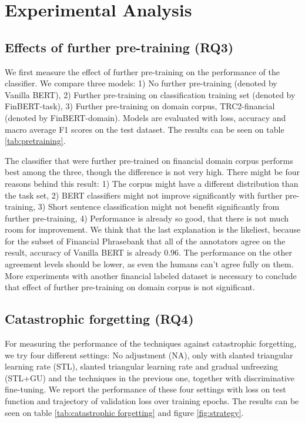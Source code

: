 \documentclass[../main.tex]{subfiles}
\begin{document}
\section{Experimental Analysis} \label{exp_analysis}

\subsection{Effects of further pre-training (RQ3)}
We first measure the effect of further pre-training on the performance of the classifier. We  compare three models: 1) No further pre-training (denoted by Vanilla BERT), 2) Further pre-training on classification training set (denoted by FinBERT-task), 3) Further pre-training on domain corpus, TRC2-financial (denoted by FinBERT-domain). Models are evaluated with loss, accuracy and macro average F1 scores on the test dataset. The results can be seen on table \ref{tab:pretraining}.

    
    
The classifier that were further pre-trained on financial domain corpus performs best among the three, though the difference is not very high. There might be four reasons behind this result: 1) The corpus might have a different distribution than the task set, 2) BERT classifiers might not improve significantly with further pre-training, 3) Short sentence classification might not benefit significantly from further pre-training, 4) Performance is already so good, that there is not much room for improvement. We think that the last explanation is the likeliest, because for the subset of Financial Phrasebank that all of the annotators agree on the result, accuracy of Vanilla BERT is already 0.96. The performance on the other agreement levels should be lower, as even the humans can't agree fully on them. More experiments with another financial labeled dataset is necessary to conclude that effect of further pre-training on domain corpus is not significant.

\subsection{Catastrophic forgetting (RQ4)}
For measuring the performance of the techniques against catastrophic forgetting, we try four different settings: No adjustment (NA), only with slanted triangular learning rate (STL), slanted triangular learning rate and gradual unfreezing (STL+GU) and the techniques in the previous one, together with discriminative fine-tuning. We report the performance of these four settings with loss on test function and trajectory of validation loss over training epochs. The results can be seen on table \ref{tab:catastrophic forgetting} and figure \ref{fig:strategy}.
\end{document}
